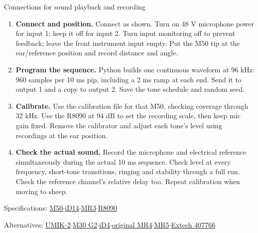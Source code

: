 \documentclass[11pt,letterpaper]{article}
\begin{document}
{\fontsize{9}{11}\selectfont Connections for sound playback and recording\par}
\begin{enumerate}[leftmargin=0.24in,labelsep=0.09in,itemsep=6pt,topsep=7pt]
\item \textbf{Connect and position.} Connect as shown. Turn on 48 V microphone power for input 1; keep it off for input 2. Turn input monitoring off to prevent feedback; leave the front instrument input empty. Put the M50 tip at the ear/reference position and record distance and angle.
\item \textbf{Program the sequence.} Python builds one continuous waveform at 96 kHz: 960 samples per 10 ms pip, including a 2 ms ramp at each end. Send it to output 1 and a copy to output 2. Save the tone schedule and random seed.
\item \textbf{Calibrate.} Use the calibration file for that M50, checking coverage through 32 kHz. Use the R8090 at 94 dB to set the recording scale, then keep mic gain fixed. Remove the calibrator and adjust each tone's level using recordings at the ear position.
\item \textbf{Check the actual sound.} Record the microphone and electrical reference simultaneously during the actual 10 ms sequence. Check level at every frequency, short-tone transitions, ringing and stability through a full run. Check the reference channel's relative delay too. Repeat calibration when moving to sheep.
\end{enumerate}
{\fontsize{9}{11}\selectfont Specifications: \href{https://earthworksaudio.com/measurement-microphones/m50/}{M50}\enspace $\cdot$\enspace \href{https://audient.com/products/audio-interfaces/id14/tech-specs/}{iD14}\enspace $\cdot$\enspace \href{https://www.edifier.com/global/p/studio-monitors/mr3}{MR3}\enspace $\cdot$\enspace \href{https://www.reedinstruments.com/pdfs/cache/www.reedinstruments.com/r8090/datasheet/r8090-datasheet.pdf}{R8090}\par Alternatives: \href{https://www.minidsp.com/images/documents/miniDSP\%20UMIK-2-User\%20Manual.pdf}{UMIK-2}\enspace $\cdot$\enspace \href{https://earthworksaudio.com/wp-content/uploads/2025/11/Earthworks_Audio_M30_G2__11042025-1.pdf}{M30 G2}\enspace $\cdot$\enspace \href{https://audient.com/products/audio-interfaces/id4/tech-specs/}{iD4}\enspace $\cdot$\enspace \href{https://www.edifier.com/global/p/studio-monitors/mr4}{original MR4}\enspace $\cdot$\enspace \href{https://us.edifier.com/products/mr5}{MR5}\enspace $\cdot$\enspace \href{https://prod.extech.com/products/407766/}{Extech 407766}\par}
\end{document}
